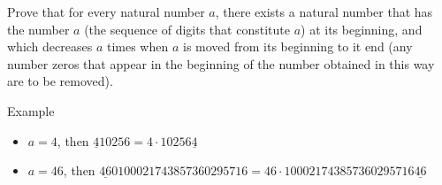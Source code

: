 Prove that for every natural number $a$, there exists a natural number that has the number $a$ (the sequence of digits that constitute $a$) at its beginning, and which decreases $a$ times when $a$ is moved from its beginning to it end (any number zeros that appear in the beginning of the number obtained in this way are to be removed).

Example
\begin{itemize}
	\item $a=4$, then $\underline{4}10256= 4 \cdot 10256\underline{4}$
	\item $a=46$, then $\underline{46}0100021743857360295716= 46 \cdot 100021743857360295716\underline{46}$
\end{itemize}
